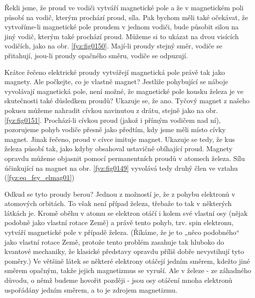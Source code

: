     Řekli jsme, že proud ve vodiči vytváří magnetické pole a že v magnetickém poli působí na vodič, 
    kterým prochází proud, síla. Pak bychom měli také očekávat, že vytvoříme-li magnetické pole 
    proudem v jednom vodiči, bude působit silou na jiný vodič, kterým také prochází proud. Můžeme 
    si to ukázat na dvou visících vodičích, jako na obr. \ref{fyz:fig0150}. Mají-li proudy 
    stejný směr, vodiče se přitahují, jsou-li proudy opačného směru, vodiče se odpuzují.
    
    Krátce řečeno elektrické proudy vytvářejí magnetická pole právě tak jako magnety. Ale počkejte, 
    co je vlastně magnet? Jestliže pohybující se náboje vyvolávají magnetická pole, není možné, že 
    magnetické pole kousku železa je ve skutečnosti také důsledkem proudů? Ukazuje se, že ano. 
    Tyčový magnet z našeho pokusu můžeme nahradit cívkou navinutou z drátu, stejně jako na obr. 
    \ref{fyz:fig0151}. Prochází-li cívkou proud (jakož i přímým vodičem nad ní), pozorujeme 
    pohyb vodiče přesně jako předtím, kdy jsme měli místo cívky magnet. Jinak řečeno, proud v cívce 
    imituje magnet. Ukazuje se tedy, že kus železa působí tak, jako kdyby obsahoval ustavičně 
    obíhající proud. Magnety opravdu můžeme objasnit pomocí permanentních proudů v atomech železa. 
    Sílu účinkující na magnet na obr. \ref{fyz:fig0149} vyvolává tedy druhý člen ve vztahu 
    (\ref{fyz:eq_fey_elmag01})      
    
  
    Odkud se tyto proudy berou? Jednou z možností je, že z pohybu elektronů v atomových orbitách. 
    To však není případ železa, třebaže to tak v některých látkách je. Kromě oběhu v atomu se 
    elektron otáčí i kolem své vlastní osy (nějak podobně jako vlastní rotace Země) a právě tento 
    pohyb, tzv. spin elektronu, vytváří magnetické pole v případě železa. (Říkáme, že je to „něco 
    podobného“ jako vlastní rotace Země, protože tento problém zasahuje tak hluboko do kvantové 
    mechaniky, že klasické představy opravdu příliš dobře nevystihují tyto poměry.) Ve většině 
    látek se některé elektrony otáčejí jedním směrem, kdežto jiné směrem opačným, takže jejich 
    magnetizmus se vyruší. Ale v železe - ze záhadného důvodu, o němž budeme hovořit později - jsou 
    osy otáčení mnoha elektronů uspořádány jedním směrem, a to je zdrojem magnetizmu.
    
